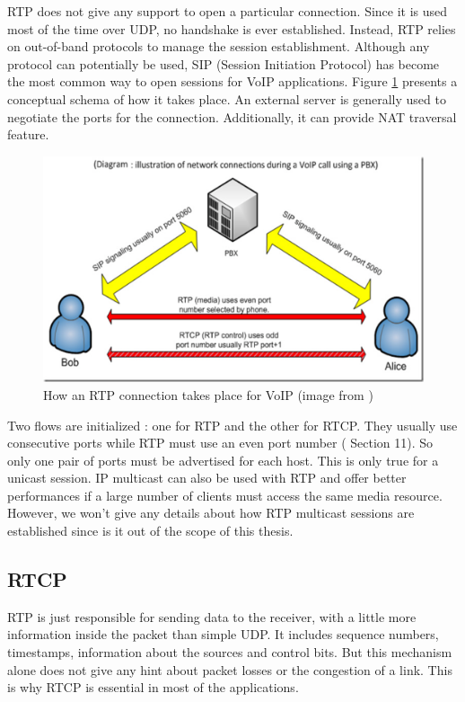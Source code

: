 RTP does not give any support to open a particular connection. Since it is used most of the time over UDP, no handshake is ever established. Instead, RTP relies on out-of-band protocols to manage the session establishment. Although any protocol can potentially be used, SIP (Session Initiation Protocol) has become the most common way to open sessions for VoIP applications. Figure \ref{fig:rtp-sip} presents a conceptual schema of how it takes place. An external server is generally used to negotiate the ports for the connection. Additionally, it can provide NAT traversal feature.
\newpage
\begin{figure}[!ht]
\centering
\includegraphics[width=0.9\linewidth]{images/rtp_sip}
\caption[VoIP with RTP connection]{How an RTP connection takes place for VoIP (image from \cite{rtp-sip})}
\label{fig:rtp-sip}
\end{figure}


Two flows are initialized : one for RTP and the other for RTCP. They usually use consecutive ports while RTP must use an even port number (\cite{RFC3550} Section 11). So only one pair of ports must be advertised for each host. This is only true for a unicast session. IP multicast can also be used with RTP and offer better performances if a large number of clients must access the same media resource. However, we won't give any details about how RTP multicast sessions are established since is it out of the scope of this thesis.

\subsection{RTCP}

RTP is just responsible for sending data to the receiver, with a little more information inside the packet than simple UDP. It includes sequence numbers, timestamps, information about the sources and control bits. But this mechanism alone does not give any hint about packet losses or the congestion of a link. This is why RTCP is essential in most of the applications.

